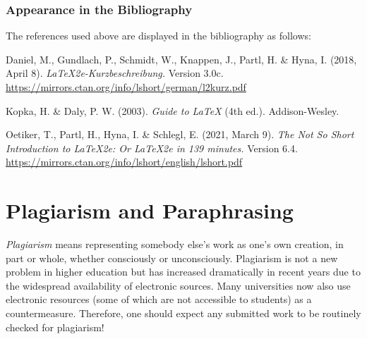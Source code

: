 \subsubsection{Appearance in the Bibliography}

\begin{sloppypar}
The references used above are displayed in the bibliography as follows:
%
\begin{list}{}{
\setlength{\leftmargin}{1.3cm}
\setlength{\itemindent}{-1.3cm}
\setlength{\itemsep}{-0.15cm}
}
\item
Daniel, M., Gundlach, P., Schmidt, W., Knappen, J., Partl, H. \& Hyna, I.
(2018, April 8). \textit{\LaTeX2e-Kurzbeschreibung.} Version 3.0c.
\textrm{\url{https://mirrors.ctan.org/info/lshort/german/l2kurz.pdf}}
\item
Kopka, H. \& Daly, P. W. (2003). \textit{Guide to \LaTeX} (4th ed.).
Addison-Wesley.
\item
Oetiker, T., Partl, H., Hyna, I. \& Schlegl, E. (2021, March 9). \textit{The
Not So Short Introduction to \LaTeX2e: Or \LaTeX2e in 139 minutes.} Version 6.4.
\url{https://mirrors.ctan.org/info/lshort/english/lshort.pdf}
\end{list}
\end{sloppypar}


\section{Plagiarism and Paraphrasing}
\label{sec:plagiarism}

\emph{Plagiarism} means representing somebody else's work as one's own creation, in part
or whole, whether consciously or unconsciously. Plagiarism is not a new problem
in higher education but has increased dramatically in recent years due
to the widespread availability of electronic sources. Many universities now also use electronic
resources (some of which are not accessible to students) as a countermeasure.
Therefore, one should expect any submitted work to be routinely checked for
plagiarism!

